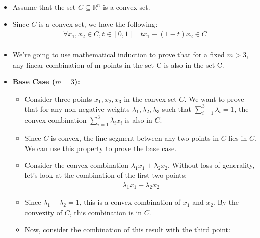 \documentclass[12pt]{article}
\begin{document}
\begin{itemize}
            \item Assume that the set $C \subseteq \mathbb{R}^n $ is a convex set.
            \item Since $C$ is a convex set, we have the following:
            \begin{equation*}
                \begin{split}
                 \forall x_1, x_2 \in C, t \in [0,1] \quad tx_1+(1-t)x_2\in C \\
                \end{split}
            \end{equation*}
            \item We're going to use mathematical induction to prove that for a fixed $m > 3$, any linear combination of m points in the set C is also in the set C.
            \item \textbf{Base Case ($m = 3$):}
            \begin{itemize}
                \item Consider three points $x_1, x_2, x_3$ in the convex set $C$. We want to prove that for any non-negative weights $\lambda_1, \lambda_2, \lambda_3$ such that $\sum_{i=1}^{3} \lambda_i = 1$, the convex combination $\sum_{i=1}^{3} \lambda_i x_i$ is also in $C$.
                \item Since \(C\) is convex, the line segment between any two points in \(C\) lies in \(C\). We can use this property to prove the base case.
                \item Consider the convex combination \(\lambda_1 x_1 + \lambda_2 x_2\). Without loss of generality, let's look at the combination of the first two points:
                \begin{equation*}
                    \begin{split}
                        \lambda_1 x_1 + \lambda_2 x_2
                    \end{split}
                \end{equation*}
                \item Since \(\lambda_1 + \lambda_2 = 1\), this is a convex combination of \(x_1\) and \(x_2\). By the convexity of \(C\), this combination is in \(C\).
                \item Now, consider the combination of this result with the third point:
                \begin{equation*}
                    \begin{split}

\end{split}
\end{equation*}
\end{itemize}
\end{itemize}
\end{document}
